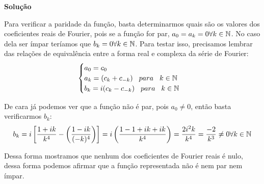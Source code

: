 \linespread{1.5}

\textbf{Solução}

Para verificar a paridade da função, basta determinarmos quais são os valores dos coeficientes reais de Fourier, pois se a função for par, $a_0=a_k=0\forall k \in \mathbb{N}$. No caso dela ser ímpar teríamos que $b_k=0\forall k \in \mathbb{N}$. Para testar isso, precisamos lembrar das relações de equivalência entre a forma real e complexa da série de Fourier:
\begin{equation*}
    \begin{cases}
        a_0 = c_0\\
        a_k = (c_k + c_{-k})\hspace{0.3cm}para\hspace{0.3cm}k\in\mathbb{N}\\
        b_k = i(c_k - c_{-k})\hspace{0.3cm}para\hspace{0.3cm}k\in\mathbb{N}
    \end{cases}
\end{equation*}

De cara já podemos ver que a função não é par, pois $a_0\neq0$, então basta verificarmos $b_k$:
\begin{equation*}
    b_k = i\left[\frac{1+ik}{k^4} - \left(\frac{1-ik}{(-k)^4}\right) \right] = i\left(\frac{1 -1 + ik + ik}{k^4}\right) = \frac{2i^2k}{k^4} = \frac{-2}{k^3} \neq 0 \forall k \in \mathbb{N}
\end{equation*}

Dessa forma mostramos que nenhum dos coeficientes de Fourier reais é nulo, dessa forma podemos afirmar que a função representada não é nem par nem ímpar.